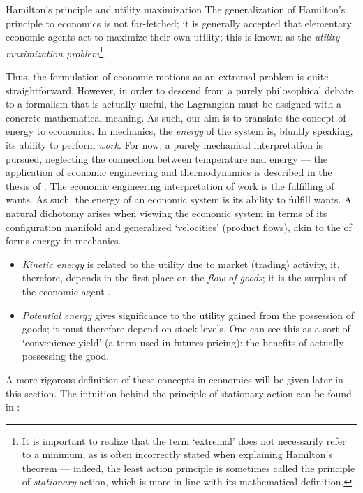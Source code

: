 \begin{econ}{Hamilton's principle and utility maximization}
    The generalization of Hamilton's principle to economics is not far-fetched; it is generally accepted that elementary economic agents act to maximize their own utility; this is known as the \emph{utility maximization problem}\footnote{It is important to realize that the term `extremal' does not necessarily refer to a minimum, as is often incorrectly stated when explaining Hamilton's theorem --- indeed, the least action principle is sometimes called the principle of \emph{stationary} action, which is more in line with its mathematical definition.}. \\

    Thus, the formulation of economic motions as an extremal problem is quite straightforward. However, in order to descend from a purely philosophical debate to a formalism that is actually useful, the Lagrangian must be assigned with a concrete mathematical meaning. As such, our aim is to translate the concept of energy to economics. In mechanics, the \emph{energy} of the system is, bluntly speaking, its ability to perform \emph{work}. For now, a purely mechanical interpretation is pursued, neglecting the connection between temperature and energy --- the application of economic engineering and thermodynamics is described in the thesis of \citet{Manders2019}. The economic engineering interpretation of work is the fulfilling of wants. As such, the energy of an economic system is its ability to fulfill wants. A natural dichotomy arises when viewing the economic system in terms of its configuration manifold and generalized `velocities' (product flows), akin to the of forms energy in mechanics.
    \begin{itemize}
        \item \emph{Kinetic energy} is related to the utility due to market (trading) activity, it, therefore, depends in the first place on the \emph{flow of goods}; it is the surplus of the economic agent \cite{Mankiw2017}.
        \item \emph{Potential energy} gives significance to the utility gained from the possession of goods; it must therefore depend on stock levels. One can see this as a sort of `convenience yield' (a term used in futures pricing): the benefits of actually possessing the good.
    \end{itemize}
    A more rigorous definition of these concepts in economics will be given later in this section. The intuition behind the principle of stationary action can be found in \citet{Feynman2010}:

\end{econ}
